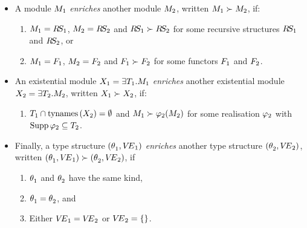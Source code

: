 \begin{itemize}
\item A module $\M_1$
{\sl enriches} another module
$\M_2$, written $\M_1\succ\M_2$, if:
\begin{enumerate}
\item $\M_1=\RS_1$, $\M_2=\RS_2$ and $\RS_1\succ\RS_2$ for some recursive structures 
      $\RS_1$ and $\RS_2$, or
\item $\M_1=\F_1$, $\M_2=\F_2$ and $\F_1\succ\F_2$ for some functors
      $\F_1$ and $\F_2$.
\end{enumerate}

\item An existential module $\XM_1=\longexmod[1]$
{\sl enriches} another existential module
$\XM_2=\longexmod[2]$, written $\XM_1\succ\XM_2$, if:
\begin{enumerate}
\item  $\T_1\cap\TyNamesFcn{(\XM_2)} = \emptyset$ and 
$\M_1\succ\tyrea_2(\M_2)$ for some realisation $\tyrea_2$ with $\Supp \tyrea_2 \subseteq \T_2$.
\end{enumerate}

\item Finally, a type structure $(\typefnc_1,\VE_1)$
{\sl enriches} another type structure $(\typefnc_2,\VE_2)$,
written $(\typefnc_1,\VE_1)\succ(\typefnc_2,\VE_2)$,
if
\begin{enumerate}
\item $\typefnc_1$ and $\typefnc_2$ have the same kind,
\item $\typefnc_1=\typefnc_2$, and
\item Either $\VE_1=\VE_2$ or $\VE_2=\emptymap$.
\end{enumerate}
\end{itemize}


